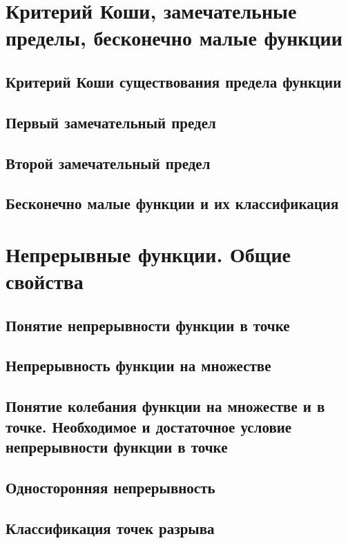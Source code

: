 \section{Критерий Коши, замечательные пределы, бесконечно малые функции}
\subsection{Критерий Коши существования предела функции}
\subsection{Первый замечательный предел}

\subsection{Второй замечательный предел}

\subsection{Бесконечно малые функции и их классификация}


\section{Непрерывные функции. Общие свойства}
\subsection{Понятие непрерывности функции в точке}

\subsection{Непрерывность функции на множестве}

\subsection{Понятие колебания функции на множестве и в точке. Необходимое и достаточное условие непрерывности функции в точке}

\subsection{Односторонняя непрерывность}

\subsection{Классификация точек разрыва}

